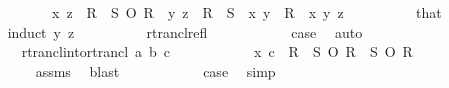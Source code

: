 \begin{isabellebody}
\ \ \ \ \isamarkupfalse%
\ {\isacharminus}{\kern0pt}\isanewline
\ \ \ \ \ \ \isamarkupfalse%
\ {\isachardoublequoteopen}{\isacharparenleft}{\kern0pt}x{\isacharcomma}{\kern0pt}\ z{\isacharparenright}{\kern0pt}\ {\isasymin}\ {\isacharparenleft}{\kern0pt}R\ {\isasymunion}\ S{\isacharparenright}{\kern0pt}\isactrlsup {\isacharasterisk}{\kern0pt}\ O\ R{\isachardoublequoteclose}\ \ {\isachardoublequoteopen}{\isacharparenleft}{\kern0pt}y{\isacharcomma}{\kern0pt}\ z{\isacharparenright}{\kern0pt}\ {\isasymin}\ {\isacharparenleft}{\kern0pt}R\ {\isasymunion}\ S{\isacharparenright}{\kern0pt}\isactrlsup {\isacharasterisk}{\kern0pt}{\isachardoublequoteclose}\ \ {\isachardoublequoteopen}{\isacharparenleft}{\kern0pt}x{\isacharcomma}{\kern0pt}\ y{\isacharparenright}{\kern0pt}\ {\isasymin}\ R{\isachardoublequoteclose}\ \ x\ y\ z\isanewline
\ \ \ \ \ \ \ \ \isamarkupfalse%
\ that\isanewline
\ \ \ \ \ \ \isamarkupfalse%
\ {\isacharparenleft}{\kern0pt}induct\ y\ z{\isacharparenright}{\kern0pt}\isanewline
\ \ \ \ \ \ \ \ \isamarkupfalse%
\ rtrancl{\isacharunderscore}{\kern0pt}refl\isanewline
\ \ \ \ \ \ \ \ \isamarkupfalse%
\ \isamarkupfalse%
\ {\isacharquery}{\kern0pt}case\ \isamarkupfalse%
\ auto\isanewline
\ \ \ \ \ \ \isamarkupfalse%
\isanewline
\ \ \ \ \ \ \ \ \isamarkupfalse%
\ {\isacharparenleft}{\kern0pt}rtrancl{\isacharunderscore}{\kern0pt}into{\isacharunderscore}{\kern0pt}rtrancl\ a\ b\ c{\isacharparenright}{\kern0pt}\isanewline
\ \ \ \ \ \ \ \ \isamarkupfalse%
\ \isamarkupfalse%
\ {\isachardoublequoteopen}{\isacharparenleft}{\kern0pt}x{\isacharcomma}{\kern0pt}\ c{\isacharparenright}{\kern0pt}\ {\isasymin}\ {\isacharparenleft}{\kern0pt}{\isacharparenleft}{\kern0pt}R\ {\isasymunion}\ S{\isacharparenright}{\kern0pt}\isactrlsup {\isacharasterisk}{\kern0pt}\ O\ {\isacharparenleft}{\kern0pt}R\ {\isasymunion}\ S{\isacharparenright}{\kern0pt}\isactrlsup {\isacharasterisk}{\kern0pt}{\isacharparenright}{\kern0pt}\ O\ R{\isachardoublequoteclose}\isanewline
\ \ \ \ \ \ \ \ \ \ \isamarkupfalse%
\ assms\ \isamarkupfalse%
\ blast\isanewline
\ \ \ \ \ \ \ \ \isamarkupfalse%
\ \isamarkupfalse%
\ {\isacharquery}{\kern0pt}case\ \isamarkupfalse%
\ simp\isanewline
\ \ \ \ \ \ \isamarkupfalse%
\isanewline
\ \ \ \ \ \ \isamarkupfalse%

\end{isabellebody}
